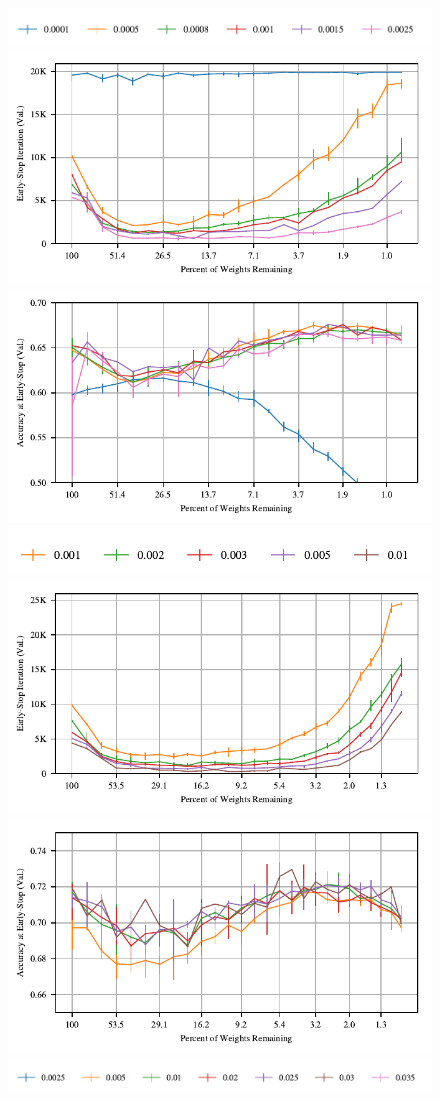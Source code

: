 \begin{figure}
\centering
\includegraphics[width=.8\textwidth]{graphs/cifar10/conv/sgd_rate_sweep1/legend}
\includegraphics[width=.5\textwidth]{graphs/cifar10/conv/sgd_rate_sweep1/iteration}%
\includegraphics[width=.5\textwidth]{graphs/cifar10/conv/sgd_rate_sweep1/accuracy}
\includegraphics[width=.6\textwidth]{graphs/cifar10/conv/sgd_rate_sweep2/legend}
\includegraphics[width=.5\textwidth]{graphs/cifar10/conv/sgd_rate_sweep2/iteration}%
\includegraphics[width=.5\textwidth]{graphs/cifar10/conv/sgd_rate_sweep2/accuracy}
\includegraphics[width=.8\textwidth]{graphs/cifar10/conv/sgd_rate_sweep3/legend}

\end{figure}

